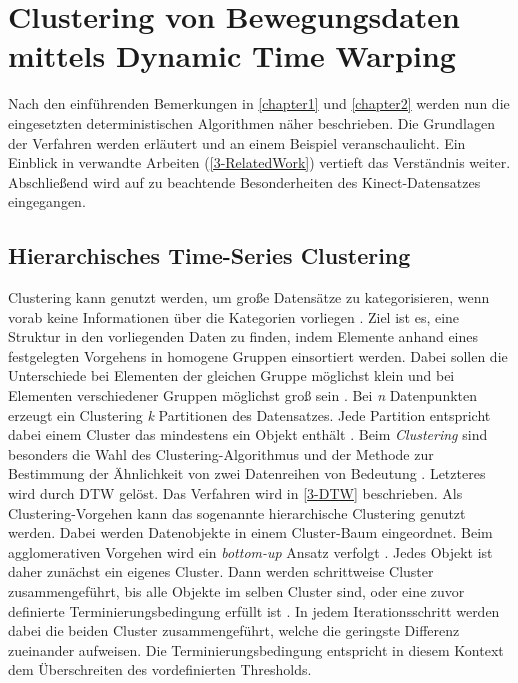 \chapter{Clustering von Bewegungsdaten mittels Dynamic Time Warping}
\label{chapter3}

Nach den einführenden Bemerkungen in \autoref{chapter1} und \autoref{chapter2} werden nun
die eingesetzten deterministischen Algorithmen näher beschrieben.
Die Grundlagen der Verfahren werden erläutert und an einem Beispiel veranschaulicht.
Ein Einblick in verwandte Arbeiten (\autoref{3-RelatedWork}) vertieft das Verständnis weiter.
Abschließend wird auf zu beachtende Besonderheiten des Kinect-Datensatzes eingegangen.

\section{Hierarchisches Time-Series Clustering}
\label{3-Clustering}
Clustering kann genutzt werden, um große Datensätze zu kategorisieren,
wenn vorab keine Informationen über die Kategorien vorliegen \citep{aghabozorgi_time-series_2015}.
Ziel ist es, eine Struktur in den vorliegenden Daten zu finden,
indem Elemente anhand eines festgelegten Vorgehens in homogene Gruppen einsortiert werden.
Dabei sollen die Unterschiede bei Elementen der gleichen Gruppe möglichst klein
und bei Elementen verschiedener Gruppen möglichst groß sein \citep{aghabozorgi_time-series_2015, warren_liao_clustering_2005}.
Bei \emph{n} Datenpunkten erzeugt ein Clustering \emph{k} Partitionen des Datensatzes.
Jede Partition entspricht dabei einem Cluster das mindestens ein Objekt enthält \citep{warren_liao_clustering_2005}.
Beim \emph{Clustering} sind besonders die Wahl des Clustering-Algorithmus
und der Methode zur Bestimmung der Ähnlichkeit von zwei Datenreihen von Bedeutung \citep{warren_liao_clustering_2005}.
Letzteres wird durch \ac{DTW} gelöst.
Das Verfahren wird in \autoref{3-DTW} beschrieben.
Als Clustering-Vorgehen kann das sogenannte hierarchische Clustering genutzt werden.
Dabei werden Datenobjekte in einem Cluster-Baum eingeordnet.
Beim agglomerativen Vorgehen wird ein \emph{bottom-up} Ansatz verfolgt \citep{warren_liao_clustering_2005}.
Jedes Objekt ist daher zunächst ein eigenes Cluster.
Dann werden schrittweise Cluster zusammengeführt,
bis alle Objekte im selben Cluster sind,
oder eine zuvor definierte Terminierungsbedingung erfüllt ist \citep{warren_liao_clustering_2005}.
In jedem Iterationsschritt werden dabei die beiden Cluster zusammengeführt,
welche die geringste Differenz zueinander aufweisen.
Die Terminierungsbedingung entspricht in diesem Kontext dem Überschreiten des vordefinierten Thresholds.

